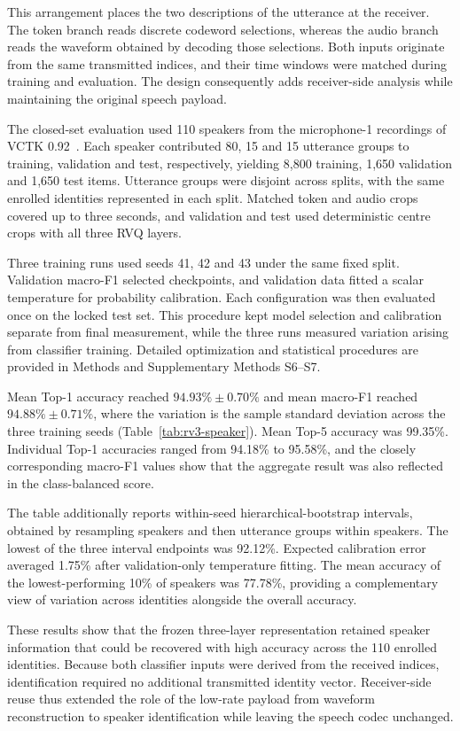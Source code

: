 This arrangement places the two descriptions of the utterance at the receiver. The token branch reads discrete codeword selections, whereas the audio branch reads the waveform obtained by decoding those selections. Both inputs originate from the same transmitted indices, and their time windows were matched during training and evaluation. The design consequently adds receiver-side analysis while maintaining the original speech payload.

The closed-set evaluation used 110 speakers from the microphone-1 recordings of VCTK 0.92~\cite{vctk}. Each speaker contributed 80, 15 and 15 utterance groups to training, validation and test, respectively, yielding 8,800 training, 1,650 validation and 1,650 test items. Utterance groups were disjoint across splits, with the same enrolled identities represented in each split. Matched token and audio crops covered up to three seconds, and validation and test used deterministic centre crops with all three RVQ layers.

Three training runs used seeds 41, 42 and 43 under the same fixed split. Validation macro-F1 selected checkpoints, and validation data fitted a scalar temperature for probability calibration. Each configuration was then evaluated once on the locked test set. This procedure kept model selection and calibration separate from final measurement, while the three runs measured variation arising from classifier training. Detailed optimization and statistical procedures are provided in Methods and Supplementary Methods S6--S7.

Mean Top-1 accuracy reached $94.93\%\pm0.70\%$ and mean macro-F1 reached $94.88\%\pm0.71\%$, where the variation is the sample standard deviation across the three training seeds (Table~\ref{tab:rv3-speaker}). Mean Top-5 accuracy was 99.35\%. Individual Top-1 accuracies ranged from 94.18\% to 95.58\%, and the closely corresponding macro-F1 values show that the aggregate result was also reflected in the class-balanced score.

The table additionally reports within-seed hierarchical-bootstrap intervals, obtained by resampling speakers and then utterance groups within speakers. The lowest of the three interval endpoints was 92.12\%. Expected calibration error averaged 1.75\% after validation-only temperature fitting. The mean accuracy of the lowest-performing 10\% of speakers was 77.78\%, providing a complementary view of variation across identities alongside the overall accuracy.

These results show that the frozen three-layer representation retained speaker information that could be recovered with high accuracy across the 110 enrolled identities. Because both classifier inputs were derived from the received indices, identification required no additional transmitted identity vector. Receiver-side reuse thus extended the role of the low-rate payload from waveform reconstruction to speaker identification while leaving the speech codec unchanged.

